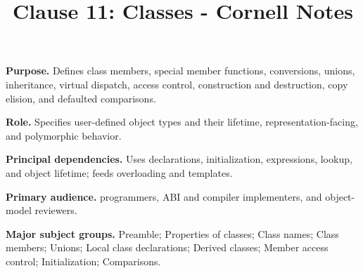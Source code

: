 \documentclass[11pt,letterpaper]{article}
\title{Clause 11: Classes - Cornell Notes}
\author{}
\date{}
\begin{document}
\maketitle
\begin{CornellReferenceOrientationBox}
\textbf{Purpose.} Defines class members, special member functions, conversions, unions, inheritance, virtual dispatch, access control, construction and destruction, copy elision, and defaulted comparisons.
\par\textbf{Role.} Specifies user-defined object types and their lifetime, representation-facing, and polymorphic behavior.
\par\textbf{Principal dependencies.} Uses declarations, initialization, expressions, lookup, and object lifetime; feeds overloading and templates.
\par\textbf{Primary audience.} programmers, ABI and compiler implementers, and object-model reviewers.
\par\textbf{Major subject groups.} Preamble; Properties of classes; Class names; Class members; Unions; Local class declarations; Derived classes; Member access control; Initialization; Comparisons.
\end{CornellReferenceOrientationBox}
\end{document}
